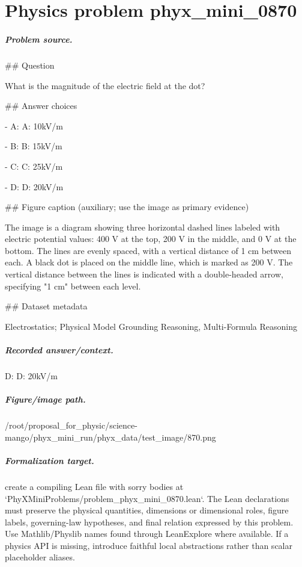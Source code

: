 
\chapter{Physics problem phyx\_mini\_0870}
\label{ch:PhyXMiniProblems_problem_phyx_mini_0870}

\paragraph{Problem source.}
\#\# Question

What is the magnitude of the electric field at the dot?

\#\# Answer choices

- A: A: 10kV/m

- B: B: 15kV/m

- C: C: 25kV/m

- D: D: 20kV/m

\#\# Figure caption (auxiliary; use the image as primary evidence)

The image is a diagram showing three horizontal dashed lines labeled with electric potential values: 400 V at the top, 200 V in the middle, and 0 V at the bottom. The lines are evenly spaced, with a vertical distance of 1 cm between each. A black dot is placed on the middle line, which is marked as 200 V. The vertical distance between the lines is indicated with a double-headed arrow, specifying "1 cm" between each level.

\#\# Dataset metadata

Electrostatics; Physical Model Grounding Reasoning, Multi-Formula Reasoning

\paragraph{Recorded answer/context.}
D: D: 20kV/m

\paragraph{Figure/image path.}
/root/proposal\_for\_physic/science-mango/phyx\_mini\_run/phyx\_data/test\_image/870.png

\paragraph{Formalization target.}
create a compiling Lean file with sorry bodies at `PhyXMiniProblems/problem\_phyx\_mini\_0870.lean`. The Lean declarations must preserve the physical quantities, dimensions or dimensional roles, figure labels, governing-law hypotheses, and final relation expressed by this problem.
Use Mathlib/Physlib names found through LeanExplore where available. If a physics API is missing, introduce faithful local abstractions rather than scalar placeholder aliases.

